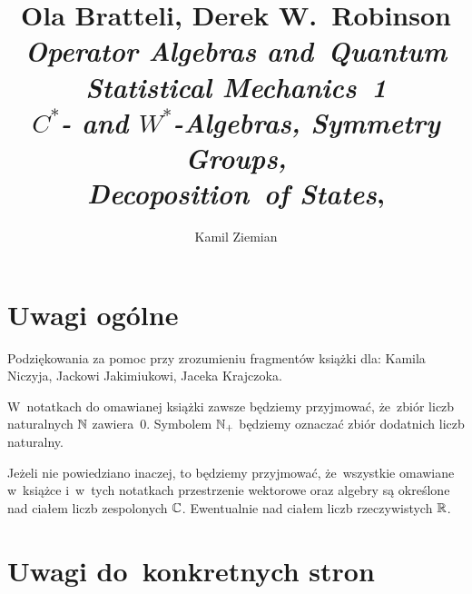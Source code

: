 \documentclass[a4paper,11pt]{article}
\title{Ola Bratteli, Derek W.~Robinson \\
  \textit{Operator Algebras and~Quantum Statistical Mechanics~1} \\
  \textit{$C^{ * }$- and $W^{ * }$-Algebras, Symmetry Groups,} \\
  \textit{Decoposition~of States},
  \cite{BratteliRobinsonOperatorAlgebrasETCVolI2002}}
\author{Kamil Ziemian}
\numberwithin{equation}{section}
\begin{document}





\maketitle





\section{Uwagi ogólne}

\label{sec:Uwagi-ogolne}




\noindent
Podziękowania za pomoc przy zrozumieniu fragmentów książki dla: Kamila
Niczyja, Jackowi Jakimiukowi, Jaceka Krajczoka.

\VerSpaceFour





\noindent
W~notatkach do omawianej książki zawsze będziemy przyjmować, że~zbiór liczb
naturalnych $\mathbb{N}$ zawiera~$0$. Symbolem $\mathbb{N}_{ + }$ będziemy oznaczać
zbiór dodatnich liczb naturalny.

\VerSpaceFour





\noindent
Jeżeli nie powiedziano inaczej, to będziemy przyjmować, że~wszystkie
omawiane w~książce i~w~tych notatkach przestrzenie wektorowe oraz algebry są
określone nad ciałem liczb zespolonych $\mathbb{C}$. Ewentualnie nad ciałem
liczb rzeczywistych $\mathbb{R}$.

\VerSpaceFour







\section{Uwagi do~konkretnych stron}

\label{sec:Uwagi-do-konkrentych-stron}
\end{document}
